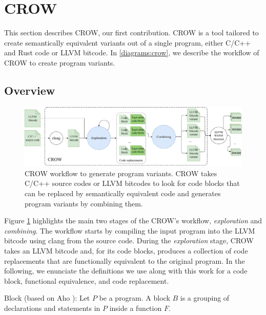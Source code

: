 
\section{CROW}
\label{section:crow}

This section describes CROW, our first contribution. CROW is a tool tailored to create semantically equivalent \wasm variants out of a single program, either C/C++ and Rust code or LLVM bitcode.
In \autoref{diagrams:crow}, we describe the workflow of CROW to create program variants.


\subsection*{Overview}

\begin{figure}[h]
    \includegraphics[width=\linewidth]{diagrams/generation/crow.drawio.pdf}
    \caption{CROW workflow to generate program variants. CROW takes C/C++ source codes or LLVM bitcodes to look for code blocks that can be replaced by semantically equivalent code and generates program variants by combining them.}
    \label{diagrams:crow}
\end{figure}

Figure \ref{diagrams:crow} highlights the main two stages of the CROW's workflow, \textit{exploration} and \textit{combining}. The workflow starts by compiling the input program into the LLVM bitcode using clang from the source code. During the \emph{exploration} stage, CROW takes an LLVM bitcode and, for its code blocks, produces a collection of code replacements that are functionally equivalent to the original program. In the following, we enunciate the definitions we use along with this work for a code block, functional equivalence, and code replacement. 


\begin{definition}{Block (based on Aho \etal \cite{ahodragonbook}):}\label{def:code-block}
    Let $P$ be a program. A block $B$ is a grouping of declarations and statements in $P$ inside a function $F$. 
\end{definition}


